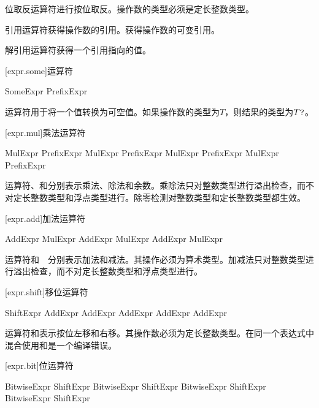 \pnum
位取反运算符进行按位取反。操作数的类型必须是定长整数类型。

\pnum
引用运算符\tcode{\&}获得操作数的引用。获得操作数的可变引用。

\pnum
解引用运算符\tcode{*}获得一个引用指向的值。

[expr.some]{运算符}

\begin{bnf}{SomeExpr}
     PrefixExpr
\end{bnf}

\pnum
{}运算符用于将一个值转换为可空值。如果操作数的类型为$T$，则结果的类型为$T\texttt{?}$。

[expr.mul]{乘法运算符}

\begin{bnf}{MulExpr}
    PrefixExpr \br
    MulExpr \terminal{*} PrefixExpr \br
    MulExpr \terminal{/} PrefixExpr \br
    MulExpr \terminal{\%} PrefixExpr
\end{bnf}

\pnum
运算符\tcode{*}、\tcode{/}和\tcode{\%}分别表示乘法、除法和余数。乘除法只对整数类型进行溢出检查，而不对定长整数类型和浮点类型进行。除零检测对整数类型和定长整数类型都生效。

[expr.add]{加法运算符}

\begin{bnf}{AddExpr}
    MulExpr \br
    AddExpr \terminal{+} MulExpr \br
    AddExpr \terminal{-} MulExpr
\end{bnf}

\pnum
运算符\tcode{+}和\ \tcode{-}\ 分别表示加法和减法。其操作必须为算术类型。加减法只对整数类型进行溢出检查，而不对定长整数类型和浮点类型进行。

[expr.shift]{移位运算符}

\begin{bnf}{ShiftExpr}
    AddExpr \br
    AddExpr  AddExpr \br
    AddExpr  AddExpr
\end{bnf}

\pnum
运算符和表示按位左移和右移。其操作数必须为定长整数类型。在同一个表达式中混合使用和是一个编译错误。

[expr.bit]{位运算符}

\begin{bnf}{BitwiseExpr}
    ShiftExpr \br
    BitwiseExpr  ShiftExpr \br
    BitwiseExpr  ShiftExpr \br
    BitwiseExpr  ShiftExpr
\end{bnf}

